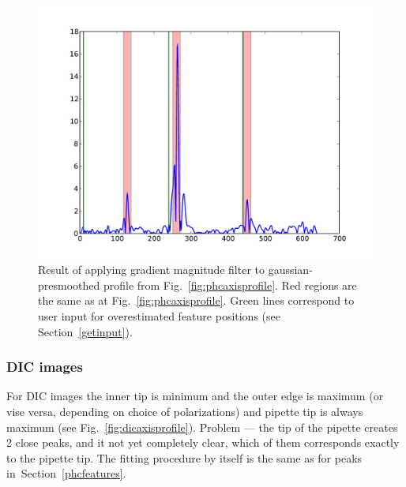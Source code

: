\begin{figure}%
\includegraphics[width=\columnwidth]{figs/phcprofilegrad.pdf}%
\caption{Result of applying gradient magnitude filter to gaussian-presmoothed profile from Fig.~\ref{fig:phcaxisprofile}. Red regions are the same as at Fig.~\ref{fig:phcaxisprofile}. Green lines correspond to user input for overestimated feature positions (see Section~\ref{getinput}).}%
\label{fig:phcprofilegrad}%
\end{figure}

\subsubsection{DIC images}\label{dicfeatures}

For DIC images the inner tip is minimum and the outer edge is maximum (or vise versa, depending on choice of polarizations) and pipette tip is always maximum (see Fig.~\ref{fig:dicaxisprofile}). Problem --- the tip of the pipette creates 2 close peaks, and it not yet completely clear, which of them corresponds exactly to the pipette tip. The fitting procedure by itself is the same as for peaks in~Section~\ref{phcfeatures}.

